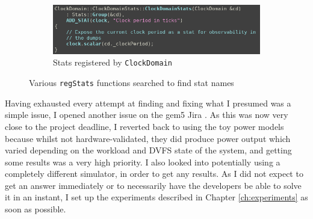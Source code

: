 \begin{figure}[H]
\begin{minipage}[b]{0.45\textwidth}
            \begin{subfigure}[b]{\linewidth}
                \centering
                \includegraphics[width=\textwidth]{screenshots/have-to-search-src-for-regStats/clock-domain-registers-a-stat.png}
                \caption{Stats registered by \texttt{ClockDomain}}
                \label{subfig:clk-dom-regStats}
            \end{subfigure}
        \end{minipage}
        \caption{Various \texttt{regStats} functions searched to find stat 
                 names}
        \label{fig:regstats-search}
    \end{figure}

    Having exhausted every attempt at finding and fixing what I presumed was a 
    simple issue, I opened another issue on the gem5 Jira 
    \cite{hansen_gem5-463_2020}. As this was now very close to the project 
    deadline, I reverted back to using the toy power models because whilst not 
    hardware-validated, they did produce power output which varied depending on 
    the workload and DVFS state of the system, and getting some results was a 
    very high priority. I also looked into potentially using a completely 
    different simulator, in order to get any results. As I did not expect to 
    get an answer immediately or to necessarily have the developers be able to 
    solve it in an instant, I set up the experiments described in Chapter 
    \ref{ch:experiments} as soon as possible.
    
